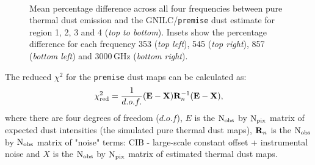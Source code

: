 \documentclass[a4paper,fleqn,usenatbib]{mnras}
\begin{document}
\begin{figure}
\,
\caption{Mean percentage difference across all four frequencies between pure thermal dust emission and the GNILC/{\texttt{premise}} dust estimate for region 1, 2, 3 and 4 ({\it{top to bottom}}). Insets show the percentage difference for each frequency 353 ({\it{top left}}), 545 ({\it{top right}}), 857 ({\it{bottom left}}) and 3000\,GHz ({\it{bottom right}}).}
\label{fig:percentAll}
\end{figure}

The reduced $\chi^{2}$ for the {\texttt{premise}} dust maps can be calculated as: 
\begin{equation}
\chi^{2}_{\rm{red}} = \frac{1}{d.o.f.} {\bf{(E - X)}} {\bf{R}}_{n}^{-1} {\bf{(E - X)}}, 
\end{equation} 
where there are four degrees of freedom ($d.o.f$), $E$ is the $\rm{N_{obs}}$ by $\rm{N_{pix}}$ matrix of expected dust intensities (the simulated pure thermal dust maps), ${\bf{R}}_{n}$ is the $\rm{N_{obs}}$ by $\rm{N_{obs}}$ matrix of "noise" terms: CIB - large-scale constant offset + instrumental noise and $X$ is the $\rm{N_{obs}}$ by $\rm{N_{pix}}$ matrix of estimated thermal dust maps. 
\end{document}
